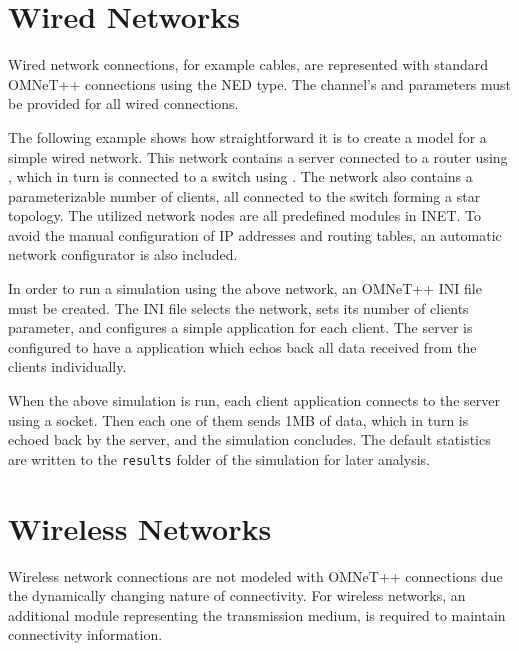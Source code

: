\section{Wired Networks}

Wired network connections, for example  cables, are
represented with standard OMNeT++ connections using the
 NED type. The channel's  and
 parameters must be provided for all wired connections.

The following example shows how straightforward it is to create a model for
a simple wired network. This network contains a server connected to a router
using , which in turn is connected to a switch using
. The network also contains a parameterizable number of
clients, all connected to the switch forming a star topology. The utilized
network nodes are all predefined modules in INET. To avoid the manual
configuration of IP addresses and routing tables, an automatic network
configurator is also included.


In order to run a simulation using the above network, an OMNeT++ INI file must
be created. The INI file selects the network, sets its number of clients
parameter, and configures a simple  application for each
client. The server is configured to have a  application which
echos back all data received from the clients individually.


When the above simulation is run, each client application connects to the
server using a  socket. Then each one of them sends 1MB of
data, which in turn is echoed back by the server, and the simulation
concludes. The default statistics are written to the \texttt{results}
folder of the simulation for later analysis.

\section{Wireless Networks}


Wireless network connections are not modeled with OMNeT++ connections due the
dynamically changing nature of connectivity. For wireless networks, an
additional module representing the transmission medium, is required to
maintain connectivity information.

